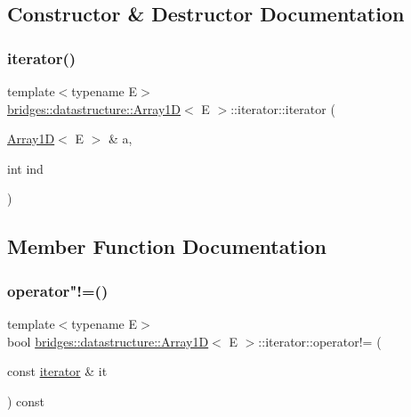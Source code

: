 \subsection{Constructor \& Destructor Documentation}
\mbox{\label{classbridges_1_1datastructure_1_1_array1_d_1_1iterator_a5bfe7e8948825c5814a95b05551496e4}} 
\subsubsection{\texorpdfstring{iterator()}{iterator()}}
{\footnotesize\ttfamily template$<$typename E$>$ \\
\mbox{\hyperlink{classbridges_1_1datastructure_1_1_array1_d}{bridges\+::datastructure\+::\+Array1D}}$<$ E $>$\+::iterator\+::iterator (\begin{DoxyParamCaption}\item[{\mbox{\hyperlink{classbridges_1_1datastructure_1_1_array1_d}{Array1D}}$<$ E $>$ \&}]{a,  }\item[{int}]{ind }\end{DoxyParamCaption})\hspace{0.3cm}{\ttfamily [inline]}}



\subsection{Member Function Documentation}
\mbox{\label{classbridges_1_1datastructure_1_1_array1_d_1_1iterator_ab9e885078d2bb6068efa5ef899b7e32b}} 
\subsubsection{\texorpdfstring{operator"!=()}{operator!=()}}
{\footnotesize\ttfamily template$<$typename E$>$ \\
bool \mbox{\hyperlink{classbridges_1_1datastructure_1_1_array1_d}{bridges\+::datastructure\+::\+Array1D}}$<$ E $>$\+::iterator\+::operator!= (\begin{DoxyParamCaption}\item[{const \mbox{\hyperlink{classbridges_1_1datastructure_1_1_array1_d_1_1iterator}{iterator}} \&}]{it }\end{DoxyParamCaption}) const\hspace{0.3cm}{\ttfamily [inline]}}

